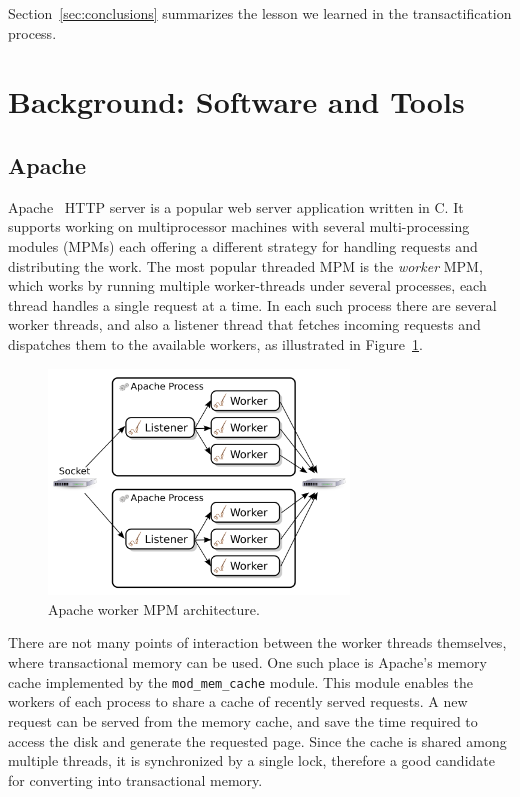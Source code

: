 \documentclass[11pt]{sigplanconf}
\let \cite = \citep
\begin{document}
Section~\ref{sec:conclusions} summarizes the lesson we learned in the 
transactification process.

\section{Background: Software and Tools}
\label{sec:background}

\subsection{Apache}\label{sec:apache}

Apache~\cite{apache} HTTP server is a popular web server application written in
C. It supports working on multiprocessor machines with several multi-processing
modules (MPMs) each offering a different strategy for handling requests and
distributing the work. The most popular threaded MPM is the \emph{worker} MPM,
which works by running multiple worker-threads under several processes, each
thread handles a single request at a time. In each such process there are
several worker threads, and also a listener thread that fetches incoming
requests and dispatches them to the available workers, as illustrated in
Figure~\ref{fig:apache-worker-MPM}.

\begin{figure}
 \begin{center}
  \includegraphics[width=8cm]{Apache-Worker-MPM.png}
 \end{center}
 \caption{Apache worker MPM architecture.}
 \label{fig:apache-worker-MPM}
\end{figure}

There are not many points of interaction between the worker threads themselves,
where transactional memory can be used. One such place is Apache's memory cache
implemented by the {\tt mod\_mem\_cache} module. This module enables the workers
of each process to share a cache of recently served requests. A new request can
be served from the memory cache, and save the time required to access the disk
and generate the requested page. Since the cache is shared among multiple
threads, it is synchronized by a single lock, therefore a good candidate for
converting into transactional memory.
\end{document}
